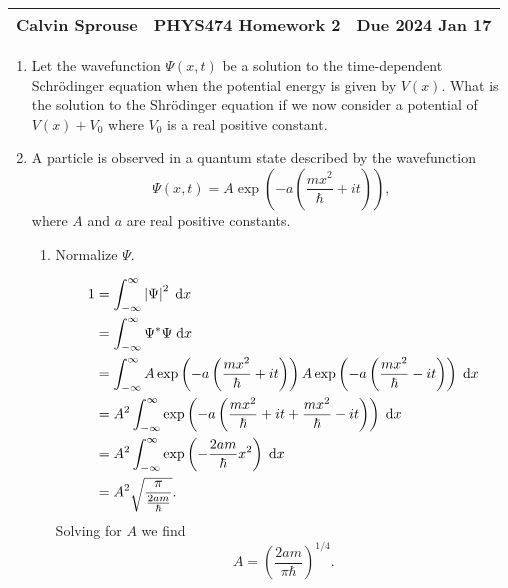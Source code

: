 \documentclass[a4paper, 12pt]{config/homework}
\begin{document}
\noindent
\begin{tabularx}{\textwidth}{>{\centering\arraybackslash}X>{\centering\arraybackslash}X>{\centering\arraybackslash}X}
Calvin Sprouse & PHYS474 Homework 2 & Due 2024 Jan 17\\
\midrule
\end{tabularx}

\begin{enumerate}
\item Let the wavefunction \(\Psi(x,t)\) be a solution to the time-dependent Schr{\"o}dinger equation when the potential energy is given by \(V(x)\). What is the solution to the Shr{\"o}dinger equation if we now consider a potential of \(V(x) + V_0\) where \(V_0\) is a real positive constant.

\pagebreak
\item A particle is observed in a quantum state described by the wavefunction
\[\Psi(x,t) = A\exp\left(-a\left(\frac{mx^2}{\hbar}+it\right)\right),\]
where \(A\) and \(a\) are real positive constants.
\begin{enumerate}[label = (\alph*)]

\item Normalize \(\Psi \).

\begin{align*}
1 &= \bint{-\infty}{\infty}{\left|\Psi\right|^2}{x}
\\&= \bint{-\infty}{\infty}{\Psi^* \Psi}{x}
\\&= \bint{-\infty}{\infty}{A\exp\left(-a\left(\frac{mx^2}{\hbar}+it\right)\right) A\exp\left(-a\left(\frac{mx^2}{\hbar}-it\right)\right)}{x}
\\&= A^2 \bint{-\infty}{\infty}{\exp\left(-a\left(\frac{mx^2}{\hbar} + it + \frac{mx^2}{\hbar} - it\right)\right)}{x}
\\&= A^2 \bint{-\infty}{\infty}{\exp\left(-\frac{2am}{\hbar}x^2\right)}{x}
\\&= A^2 \sqrt{\frac{\pi}{\frac{2am}{\hbar}}}.
\end{align*}
Solving for \(A\) we find
\[A = {\left(\frac{2am}{\pi \hbar}\right)}^{1/4}.\]


\end{enumerate}
\end{enumerate}
\end{document}
